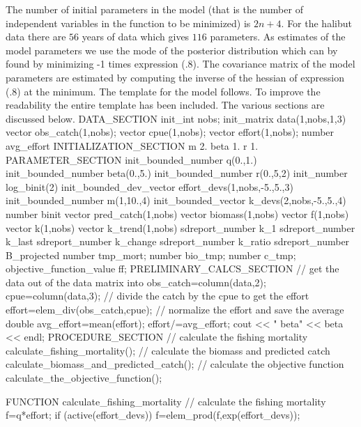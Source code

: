 \documentclass[12pt]{book}
\begin{document}
The number of initial parameters in the model (that is the number of
independent variables  in the function to be minimized)  is
$2n+4$. For the halibut data there are $56$ years of data
which gives $116$ parameters.  As estimates of the model
parameters we use the mode of the posterior distribution
which can by found by minimizing -1 times expression
(\number\mychapno.8). The covariance matrix of the model
parameters are estimated by computing the
inverse of the hessian of expression  (\number\mychapno.8)
at the minimum. The template for the model follows. 
To improve the readability the entire template has been
included. The various sections are discussed below.
\beginexample
DATA_SECTION
  init_int nobs;
  init_matrix data(1,nobs,1,3)
  vector obs_catch(1,nobs);
  vector cpue(1,nobs);
  vector effort(1,nobs);
  number avg_effort
INITIALIZATION_SECTION
  m 2.
  beta 1.
  r 1.
PARAMETER_SECTION
  init_bounded_number q(0.,1.)
  init_bounded_number beta(0.,5.)
  init_bounded_number r(0.,5,2)
  init_number log_binit(2)
  init_bounded_dev_vector effort_devs(1,nobs,-5.,5.,3)
  init_bounded_number m(1,10.,4)
  init_bounded_vector k_devs(2,nobs,-5.,5.,4)
  number binit
  vector pred_catch(1,nobs)
  vector biomass(1,nobs)
  vector f(1,nobs)
  vector k(1,nobs)
  vector k_trend(1,nobs)
  sdreport_number k_1
  sdreport_number k_last
  sdreport_number k_change
  sdreport_number k_ratio
  sdreport_number B_projected
  number tmp_mort;
  number bio_tmp;
  number c_tmp;
  objective_function_value ff;
PRELIMINARY_CALCS_SECTION
  // get the data out of the data matrix into 
  obs_catch=column(data,2);  
  cpue=column(data,3);  
  // divide the catch by the cpue to get the effort
  effort=elem_div(obs_catch,cpue);
  // normalize the effort and save the average
  double avg_effort=mean(effort);
  effort/=avg_effort;
  cout << " beta" << beta << endl;
PROCEDURE_SECTION
  // calculate the fishing mortality
  calculate_fishing_mortality();
  // calculate the biomass and predicted catch
  calculate_biomass_and_predicted_catch();
  // calculate the objective function
  calculate_the_objective_function();

FUNCTION calculate_fishing_mortality
  // calculate the fishing mortality
  f=q*effort;
  if (active(effort_devs)) f=elem_prod(f,exp(effort_devs));
\end{document}
